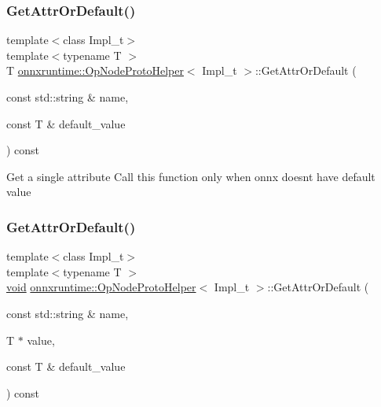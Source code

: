 \subsubsection{\texorpdfstring{Get\+Attr\+Or\+Default()}{GetAttrOrDefault()}\hspace{0.1cm}{\footnotesize\ttfamily [1/2]}}
{\footnotesize\ttfamily template$<$class Impl\+\_\+t$>$ \\
template$<$typename T $>$ \\
T \mbox{\hyperlink{classonnxruntime_1_1OpNodeProtoHelper}{onnxruntime\+::\+Op\+Node\+Proto\+Helper}}$<$ Impl\+\_\+t $>$\+::Get\+Attr\+Or\+Default (\begin{DoxyParamCaption}\item[{const std\+::string \&}]{name,  }\item[{const T \&}]{default\+\_\+value }\end{DoxyParamCaption}) const\hspace{0.3cm}{\ttfamily [inline]}}

Get a single attribute Call this function only when onnx doesn\textquotesingle{}t have default value \mbox{\label{classonnxruntime_1_1OpNodeProtoHelper_a29395a652a337744db55dbea2f0551a1}} 
\subsubsection{\texorpdfstring{Get\+Attr\+Or\+Default()}{GetAttrOrDefault()}\hspace{0.1cm}{\footnotesize\ttfamily [2/2]}}
{\footnotesize\ttfamily template$<$class Impl\+\_\+t$>$ \\
template$<$typename T $>$ \\
\mbox{\hyperlink{mlasi_8h_a88f941d423cb2a819b70a1358982b1a6}{void}} \mbox{\hyperlink{classonnxruntime_1_1OpNodeProtoHelper}{onnxruntime\+::\+Op\+Node\+Proto\+Helper}}$<$ Impl\+\_\+t $>$\+::Get\+Attr\+Or\+Default (\begin{DoxyParamCaption}\item[{const std\+::string \&}]{name,  }\item[{T $\ast$}]{value,  }\item[{const T \&}]{default\+\_\+value }\end{DoxyParamCaption}) const\hspace{0.3cm}{\ttfamily [inline]}}

